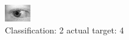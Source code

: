 \begin{figure}[h!]
\begin{center}
\includegraphics[width=0.60\columnwidth]{figures/ID845_class_2_target_4.png}
\end{center}
\caption{ Classification: 2 actual target: 4}
\label{fig:ID845_class_2_target_4}
\end{figure}
